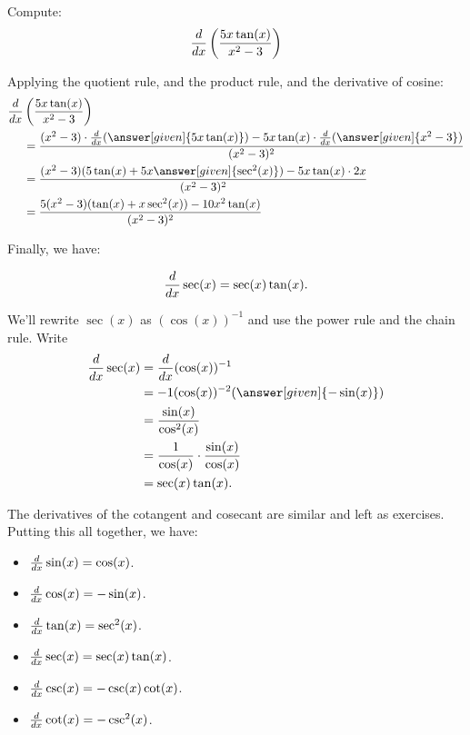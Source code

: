 \documentclass{ximera}
\begin{document}
\begin{example}
Compute:
\[
\frac{d}{\mathop{}\!d x} \left( \frac{5x \tan(x)}{x^2 - 3} \right)
\]
\begin{explanation}
Applying the quotient rule, and the product rule, and the derivative
of cosine:
\begin{align*}
  \ddx &\left( \frac{5x \tan(x)}{x^2 - 3} \right) \\
  &= \frac{(x^2 - 3) \cdot \ddx(\answer[given]{5x \tan(x)}) - 5x \tan(x) \cdot \ddx (\answer[given]{x^2 - 3})}{(x^2 - 3)^2}  \\
  &= \frac{(x^2 - 3)(5 \tan(x) + 5x \answer[given]{\sec^2(x)}) - 5x \tan(x) \cdot 2x}{(x^2 - 3)^2}  \\
  &= \frac{5(x^2-3)(\tan(x)+x \sec^2(x)) - 10x^2 \tan(x)}{(x^2-3)^2}
\end{align*}
\end{explanation}
\end{example}

Finally, we have:

\begin{theorem}
\[
\frac{d}{\mathop{}\!d x} \sec(x) = \sec(x)\tan(x).
\]


\begin{explanation}
We'll rewrite $\sec(x)$ as $(\cos(x))^{-1}$ and use the power rule and the chain rule. Write
\begin{align*}
\ddx \sec(x) &= \ddx(\cos (x))^{-1}\\
&=-1(\cos(x))^{-2}(\answer[given]{-\sin(x)}) \\
&= \frac{\sin(x)}{\cos^2(x)} \\
&= \frac{1}{\cos(x)} \cdot \frac{\sin(x)}{\cos(x)}  \\
&= \sec(x)\tan(x).
\end{align*}
\end{explanation}
\end{theorem}

The derivatives of the cotangent and cosecant are similar and left as
exercises.  Putting this all together, we have:

\begin{theorem} \hfil
\begin{itemize}
\item $\frac{d}{\mathop{}\!d x} \sin(x) = \cos(x)$.
\item $\frac{d}{\mathop{}\!d x} \cos(x) = -\sin(x)$.
\item $\frac{d}{\mathop{}\!d x} \tan(x) = \sec^2(x)$.
\item $\frac{d}{\mathop{}\!d x} \sec(x) = \sec(x)\tan(x)$.
\item $\frac{d}{\mathop{}\!d x} \csc(x) = -\csc(x)\cot(x)$.
\item $\frac{d}{\mathop{}\!d x} \cot(x) = -\csc^2(x)$.
\end{itemize}
\end{theorem}
\end{document}
